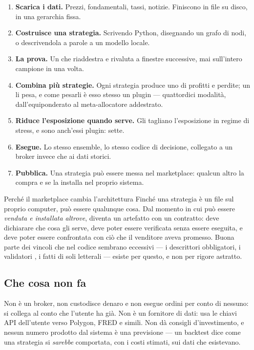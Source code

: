 \begin{enumerate}
  \item \textbf{Scarica i dati.} Prezzi, fondamentali, tassi, notizie. Finiscono
        in file  su disco, in una gerarchia fissa.
  \item \textbf{Costruisce una strategia.} Scrivendo Python, disegnando un
        grafo di nodi, o descrivendola a parole a un modello locale.
  \item \textbf{La prova.} Un  che riaddestra e rivaluta a
        finestre successive, mai sull'intero campione in una volta.
  \item \textbf{Combina più strategie.} Ogni strategia produce uno 
        di profitti e perdite; un  li pesa, e come pesarli è esso
        stesso un plugin --- quattordici modalità, dall'equiponderato al
        meta-allocatore addestrato.
  \item \textbf{Riduce l'esposizione quando serve.} Gli  tagliano
        l'esposizione in regime di stress, e sono anch'essi plugin: sette.
  \item \textbf{Esegue.} Lo stesso ensemble, lo stesso codice di decisione,
        collegato a un broker invece che ai dati storici.
  \item \textbf{Pubblica.} Una strategia può essere messa nel marketplace:
        qualcun altro la compra e se la installa nel proprio sistema.
\end{enumerate}

\begin{perche}{Perché il marketplace cambia l'architettura}
Finché una strategia è un file sul proprio computer, può essere qualunque
cosa. Dal momento in cui può essere \emph{venduta e installata altrove},
diventa un artefatto con un contratto: deve dichiarare che cosa gli serve,
deve poter essere verificata senza essere eseguita, e deve poter essere
confrontata con ciò che il venditore aveva promesso. Buona parte dei vincoli
che nel codice sembrano eccessivi --- i descrittori obbligatori, i validatori
, i  fatti di soli letterali --- esiste per questo, e
non per rigore astratto.
\end{perche}

\subsection*{Che cosa non fa}

Non è un broker, non custodisce denaro e non esegue ordini per conto di
nessuno: si collega al conto che l'utente ha già. Non è un fornitore di dati:
usa le chiavi API dell'utente verso Polygon, FRED e simili. Non dà consigli
d'investimento, e nessun numero prodotto dal sistema è una previsione --- un
backtest dice come una strategia si \emph{sarebbe} comportata, con i costi
stimati, sui dati che esistevano.
